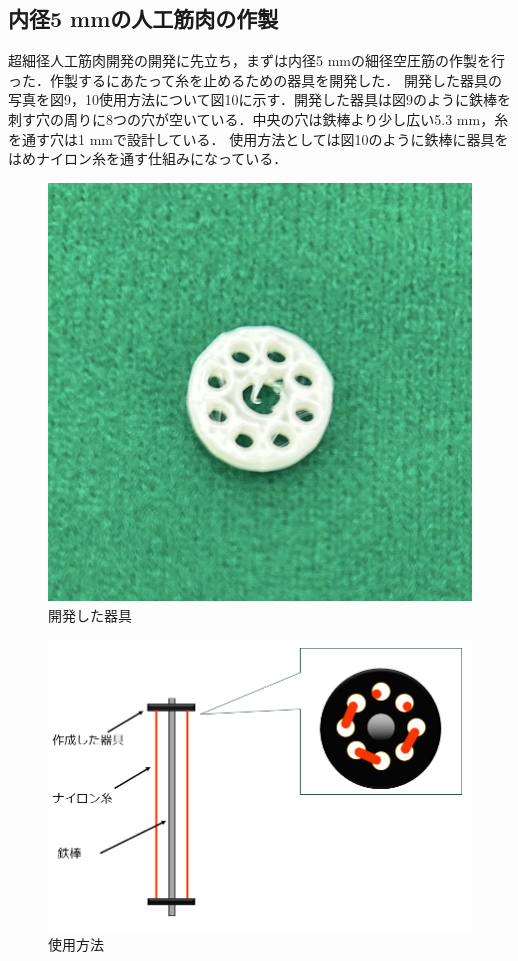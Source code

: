 \newpage
\subsection{内径5 mmの人工筋肉の作製}
超細径人工筋肉開発の開発に先立ち，まずは内径5 mmの細径空圧筋の作製を行った．作製するにあたって糸を止めるための器具を開発した．
開発した器具の写真を図9，10使用方法について図10に示す．開発した器具は図9のように鉄棒を刺す穴の周りに8つの穴が空いている．中央の穴は鉄棒より少し広い5.3 mm，糸を通す穴は1 mmで設計している．
使用方法としては図10のように鉄棒に器具をはめナイロン糸を通す仕組みになっている．
\begin{figure}[!b]
  \centering  %
  \includegraphics[scale=0.3]{pic/kigu2.jpg}
  \caption{開発した器具}
\end{figure}
\begin{figure}[!b]
  \centering  %
  \includegraphics[scale=0.3]{pic/tukau2.PNG}
  \caption{使用方法}
\end{figure}

